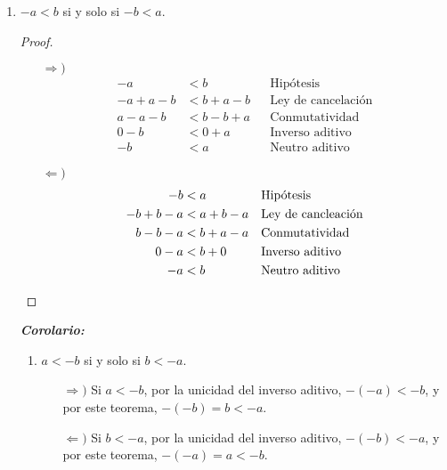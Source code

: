 \documentclass[11pt]{article}
\begin{document}
\begin{enumerate}[label=\alph*)]
    \item $-a<b$ si y solo si $-b<a$.
    \vspace{-1em}\begin{proof} \leavevmode
        \begin{center}
            \begin{minipage}[l]{.5\linewidth}
                \begin{itemize}
                    \item[$\Rightarrow)$] \begin{align*}
                        -a &< b && \text{Hipótesis}\\
                        -a+a-b &< b +a-b && \text{Ley de cancelación}\\
                        a-a-b &< b-b+a && \text{Conmutatividad}\\
                        0-b &< 0 + a && \text{Inverso aditivo}\\
                        -b &< a && \text{Neutro aditivo}
                    \end{align*}
                \end{itemize}
            \end{minipage}%
            \begin{minipage}[r]{.5\linewidth}
                \begin{itemize}
                    \item[$\Leftarrow)$] \begin{align*}
                        -b &< a && \text{Hipótesis}\\
                        -b + b-a &< a + b-a && \text{Ley de cancleación}\\
                        b-b-a &< b+a-a && \text{Conmutatividad}\\
                        0 -a &< b + 0 && \text{Inverso aditivo}\\
                        -a &< b && \text{Neutro aditivo} \qedhere
                    \end{align*}
                \end{itemize}
            \end{minipage}
            \end{center}    
    \end{proof} \vspace{-1em}

    \textbf{\textit{Corolario:}}
    \begin{enumerate}[label=\roman*)]
        \item $a<-b$ si y solo si $b<-a$.
        \begin{itemize}
            \item[$\Rightarrow)$] Si $a<-b$, por la unicidad del inverso aditivo, $-(-a) < -b$, y por este teorema, $-(-b)=b<-a$.
            \item[$\Leftarrow)$] Si $b<-a$, por la unicidad del inverso aditivo, $-(-b)<-a$, y por este teorema, $-(-a)=a<-b$.
        \end{itemize}


\end{enumerate}
\end{enumerate}
\end{document}
